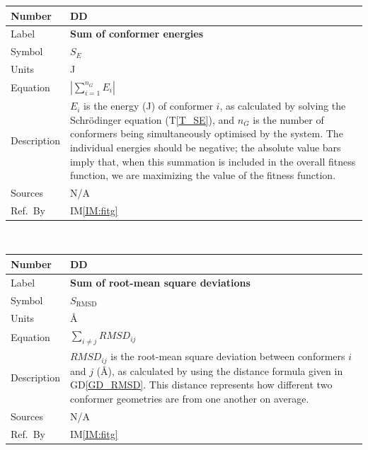 \documentclass[12pt]{article}
\newcommand{\colAwidth}{0.13\textwidth}
\newcommand{\colBwidth}{0.82\textwidth}
\newcounter{defnum} %
\newcommand{\dref}[1]{GD\ref{#1}}
\newcounter{datadefnum} %
\newcommand{\iref}[1]{IM\ref{#1}}
\begin{document}
\noindent
\begin{minipage}{\textwidth}
	\renewcommand*{\arraystretch}{1.5}
	\begin{tabular}{| p{\colAwidth} | p{\colBwidth}|}
		\hline
		\rowcolor[gray]{0.9}
		Number & DD{datadefnum}\thedatadefnum \label{Sum_E}\\
		\hline
		Label & \bf Sum of conformer energies\\
		\hline
		Symbol & $S_E$\\
		\hline
		Units & \si{\joule}\\
		\hline
		Equation & $\left|\sum\limits_{i=1}^{n_G}E_i\right|$ \\
		\hline
		Description & 
		$E_i$ is the energy (\si{\joule}) of conformer $i$, as calculated by 
		solving the Schr\"{o}dinger equation (T\ref{T_SE}), and $n_G$ is the 
		number of conformers being simultaneously optimised by the system. The 
		individual energies should be negative; the absolute value bars imply 
		that, when this summation is included in the overall fitness function, 
		we are maximizing the value of the fitness 
		function.
		\\
		\hline
		Sources& N/A \\
		\hline
		Ref.\ By & \iref{IM:fitg}\\
		\hline
	\end{tabular}
\end{minipage}\\

\noindent
\begin{minipage}{\textwidth}
	\renewcommand*{\arraystretch}{1.5}
	\begin{tabular}{| p{\colAwidth} | p{\colBwidth}|}
		\hline
		\rowcolor[gray]{0.9}
		Number & DD{datadefnum}\thedatadefnum \label{Sum_RMSD}\\
		\hline
		Label & \bf Sum of root-mean square deviations \\
		\hline
		Symbol & $S_\text{RMSD}$\\
		\hline
		Units & \si{\angstrom}\\
		\hline
		Equation & $\sum\limits_{i\neq j}RMSD_{ij}$ \\
		\hline
		Description & 
		$RMSD_{ij}$ is the root-mean square deviation between conformers $i$ 
		and $j$ (\si{\angstrom}), as calculated by using the distance formula 
		given in \dref{GD_RMSD}. This 
		distance represents how different two conformer geometries are from one 
		another on average.
		\\
		\hline
		Sources& N/A \\
		\hline
		Ref.\ By & \iref{IM:fitg}\\
		\hline
	\end{tabular}
\end{minipage}\\
\end{document}
